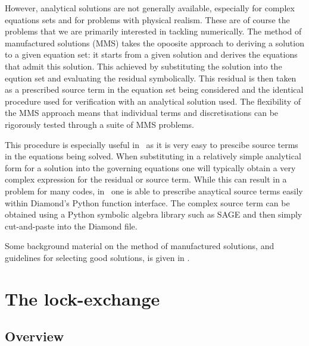 However, analytical solutions are not generally available, especially for complex equations sets
and for problems with physical realism. These are of course the problems that we are primarily 
interested in tackling numerically.
The method of manufactured solutions (MMS) takes the opoosite approach to deriving a solution to 
a given equation set: it starts from a given solution and derives the equations that admit this
solution. This achieved by substituting the solution into the eqution set and evaluating the residual
symbolically. This residual is then taken as a prescribed source term in the equation set being considered
and the identical procedure used for verification with an analytical solution used. The flexibility of the MMS
approach means that individual terms and discretisations can be rigorously tested through a suite of MMS problems. 

This procedure is especially useful in \fluidity\ as it is very easy to prescibe source terms in the equations
being solved. When substituting in a relatively simple analytical form for a solution into the governing
equations one will typically obtain a very complex expression for the residual or source term. While this
can result in a problem for many codes, in \fluidity\ one is able to prescribe anaytical source terms easily
within Diamond's Python function interface. The complex source term can be obtained using a Python symbolic algebra
library such as SAGE and then simply cut-and-paste into the Diamond file.

Some background material on the method of manufactured solutions, and guidelines for selecting good solutions,
is given in \cite{salari2000}. 


\section{The lock-exchange}
\label{sect:lock_exchange}
\subsection{Overview}
\label{sect:lock_exchange_overview}

